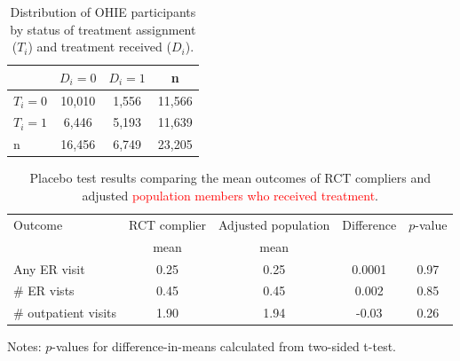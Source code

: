 \documentclass[hidelinks,12pt]{article}
\begin{document}
\begin{appendices}
\begin{table}[h]
	\begin{center}
	\caption{Distribution of OHIE participants by status of treatment assignment ($T_i$) and treatment received ($D_i$).\label{ohie-status}} 
	\begin{tabular}{@{}lccc@{}}
		\toprule
		& $D_i = 0$ & $D_i = 1$ & n      \\ \midrule
		$T_i = 0$ & 10,010    & 1,556     & 11,566 \\
		$T_i = 1$ & 6,446     & 5,193     & 11,639 \\
		n         & 16,456    & 6,749     & 23,205 \\ \bottomrule
	\end{tabular}
	\end{center}
\end{table}

\begin{table}[h]
	\begin{center}
		\caption{Placebo test results comparing the mean outcomes of RCT compliers and adjusted \textcolor{red}{population members who received treatment}.\label{placebo}} 
	\begin{tabular}{@{}lcccc@{}}
		\toprule
		Outcome                & RCT complier & Adjusted population & Difference & $p$-value \\
				               &  mean 		  & mean 					  & 		   &  \\		
		 \midrule
		Any ER visit           & 0.25              & 0.25                           & 0.0001     & 0.97    \\
		$\#$ ER vists          & 0.45              & 0.45                           & 0.002      & 0.85    \\
		$\#$ outpatient visits & 1.90              & 1.94                           & -0.03      & 0.26    \\ \bottomrule
	\end{tabular}
\end{center}
\footnotesize{Notes: $p$-values for difference-in-means calculated from two-sided t-test.}
\end{table}


\end{appendices}
\end{document}
